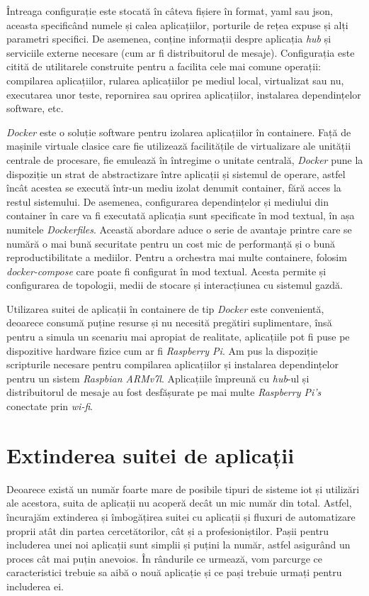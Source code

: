 Întreaga configurație este stocată în câteva fișiere în format, \acrfull{yaml} sau \acrshort{json}, aceasta specificând numele și calea aplicațiilor, porturile de rețea expuse și alți parametri specifici. De asemenea, conține informații despre aplicația \textit{hub} și serviciile externe necesare (cum ar fi distribuitorul de mesaje). Configurația este citită de utilitarele construite pentru a facilita cele mai comune operații: compilarea aplicațiilor, rularea aplicațiilor pe mediul local, virtualizat sau nu, executarea unor teste, repornirea sau oprirea aplicațiilor, instalarea dependințelor software, etc.

\textit{Docker} este o soluție software pentru izolarea aplicațiilor în containere. Față de mașinile virtuale clasice care fie utilizează facilitățile de virtualizare ale unității centrale de procesare, fie emulează în întregime o unitate centrală, \textit{Docker} pune la dispoziție un strat de abstractizare între aplicații și sistemul de operare, astfel încât acestea se execută într-un mediu izolat denumit container, fără acces la restul sistemului. De asemenea, configurarea dependințelor și mediului din container în care va fi executată aplicația sunt specificate în mod textual, în așa numitele \textit{Dockerfiles}. Această abordare aduce o serie de avantaje printre care se numără o mai bună securitate pentru un cost mic de performanță și o bună reproductibilitate a mediilor. Pentru a orchestra mai multe containere, folosim \textit{docker-compose} care poate fi configurat în mod textual. Acesta permite și configurarea de topologii, medii de stocare și interacțiunea cu sistemul gazdă.

Utilizarea suitei de aplicații în containere de tip \textit{Docker} este convenientă, deoarece consumă puține resurse și nu necesită pregătiri suplimentare, însă pentru a simula un scenariu mai apropiat de realitate, aplicațiile pot fi puse pe dispozitive hardware fizice cum ar fi \textit{Raspberry Pi}. Am pus la dispoziție scripturile necesare pentru compilarea aplicațiilor și instalarea dependințelor pentru un sistem \textit{Raspbian ARMv7l}. Aplicațiile împreună cu \textit{hub}-ul și distribuitorul de mesaje au fost desfășurate pe mai multe \textit{Raspberry Pi's} conectate prin \textit{wi-fi}.

\section{Extinderea suitei de aplicații}

Deoarece există un număr foarte mare de posibile tipuri de sisteme \acrshort{iot} și utilizări ale acestora, suita de aplicații nu acoperă decât un mic număr din total. Astfel, încurajăm extinderea și îmbogățirea suitei cu aplicații și fluxuri de automatizare proprii atât din partea cercetătorilor, cât și a profesioniștilor. Pașii pentru includerea unei noi aplicații sunt simplii și puțini la număr, astfel asigurând un proces cât mai puțin anevoios. În rândurile ce urmează, vom parcurge ce caracteristici trebuie sa aibă o nouă aplicație și ce pași trebuie urmați pentru includerea ei.

